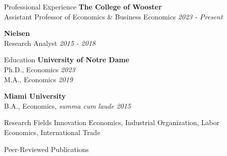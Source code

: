 \documentclass{resume} %
\begin{document}

\begin{rSection}{Professional Experience}
	{\bf The College of Wooster} \\ 
	Assistant Professor of Economics \& Business Economics \hfill {\em 2023 - Present}
	
	{\bf Nielsen}  \\
	Research Analyst \hfill {\em  2015 - 2018}
	 
\end{rSection}



\begin{rSection}{Education}
{\bf University of Notre Dame} \\ 
Ph.D., Economics \hfill {\em 2023} \\
M.A., Economics \hfill {\em 2019} 

{\bf Miami University}  \\
B.A., Economics, \textit{summa cum laude} \hfill {\em  2015}
 
\end{rSection}
 \begin{rSection}{Research Fields}
 	Innovation Economics, Industrial Organization, Labor Economics, International Trade
 \end{rSection}

\begin{rSection}{Peer-Reviewed Publications}
\end{rSection}	

\end{document}
